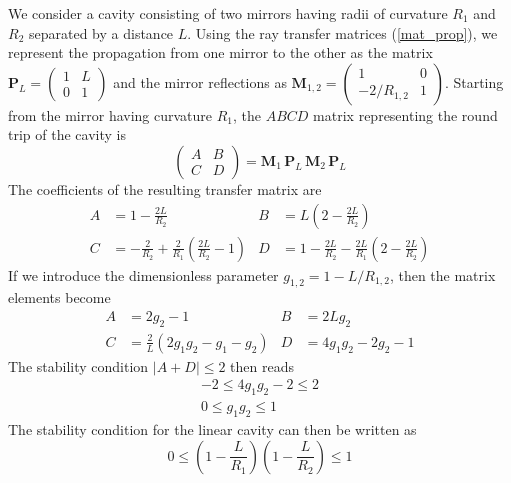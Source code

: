 We consider a cavity consisting of two mirrors having radii of curvature $R_1$ and $R_2$ separated by a distance $L$. Using the ray transfer matrices (\ref{mat_prop}), we represent the propagation from one mirror to the other as the matrix $\mathbf{P}_L = \begin{pmatrix} 1 & L \\ 0 & 1 \end{pmatrix}$ and the mirror reflections as $\mathbf{M}_{1,2} = \begin{pmatrix} 1 & 0 \\ -2/R_{1,2} & 1 \end{pmatrix}$. Starting from the mirror having curvature $R_1$, the $ABCD$ matrix representing the round trip of the cavity is
\begin{equation}
	\begin{pmatrix}
		A & B \\
		C & D
	\end{pmatrix}
	=
	\mathbf{M}_1 \, \mathbf{P}_L \, \mathbf{M}_2 \, \mathbf{P}_L
\end{equation}
The coefficients of the resulting transfer matrix are
\begin{align}
	A &= 1 - \frac{2L}{R_2} & 
	B &= L\left(2 - \frac{2L}{R_2}\right) \\
	C &= -\frac{2}{R_2} + \frac{2}{R_1}\left(\frac{2L}{R_2} - 1\right) & 
	D &= 1- \frac{2L}{R_2} - \frac{2L}{R_1}\left(2 - \frac{2L}{R_2}\right)
\end{align}
If we introduce the dimensionless parameter $g_{1,2} = 1 - L/R_{1,2}$, then the matrix elements become
\begin{align}
	A &= 2g_2-1 & B &= 2Lg_2 \\
	C &= \frac{2}{L}\left(2g_1g_2 - g_1 - g_2\right) & D &= 4g_1g_2 - 2g_2 -1
\end{align}
The stability condition $\left|A + D\right| \leq 2$ then reads
\begin{align}
	-2 \leq 4g_1g_2 - 2  \leq 2 \nonumber \\
	0 \leq g_1 g_2 \leq 1 \nonumber
\end{align}
The stability condition for the linear cavity can then be written as
\begin{equation}
	0 \leq \left(1 - \frac{L}{R_1}\right)\left(1 - \frac{L}{R_2}\right) \leq 1
\end{equation}

